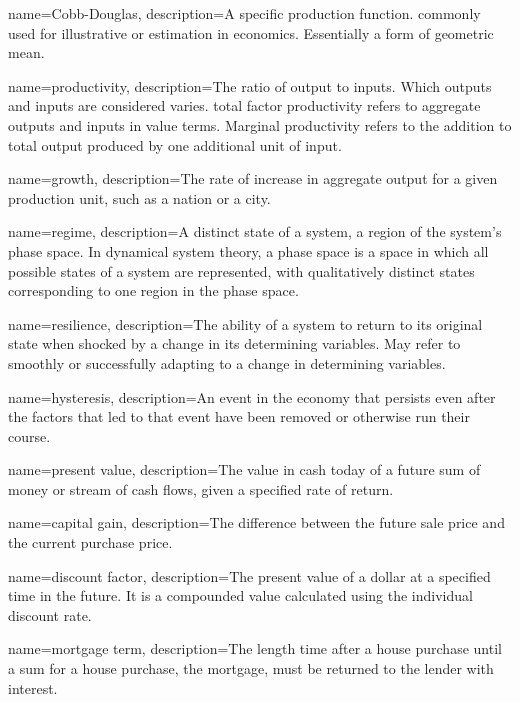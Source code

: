 {
name=Cobb-Douglas,
description={A specific production function. commonly used for illustrative or estimation in economics. Essentially a form of geometric mean.}
}

{
name=productivity,
description={The ratio of \gls{output} to \glspl{input}. Which outputs and inputs are considered varies. \gls{total factor productivity} refers to aggregate outputs and inputs in value terms. Marginal productivity refers to the addition to total output produced by one additional unit of input.} 
}

{
name=growth,
description={The rate of increase in aggregate \gls{output} for a given production unit, such as a nation  or a city.}
}

{
name=regime,
description={A distinct state of a system, a region of the system's phase space. In dynamical system theory, a phase space is a space in which all possible states of a system are represented, with qualitatively distinct  states corresponding to one region in the phase space.}
}

{
name=resilience,
description={The ability of a system to return to its original state when shocked by a change in its determining variables. May refer to smoothly or successfully adapting to a change in  determining variables.}
}

{
name=hysteresis,
description={An event in the economy that persists even after the factors that led to that event have been removed or otherwise run their course.}
}

{
name=present value,
description={The value in cash today of a future sum of money or stream of cash flows, given a specified rate of return.}
}

{
name=capital gain,
description={The difference between the future sale price and the current purchase price.}
}

{
name=discount factor,
description={The present value of a dollar at a specified time in the future. It is a compounded value calculated using the individual discount rate.}
}

{
name=mortgage term,
description={The length time after a house purchase until a sum for a house purchase, the mortgage, must be returned to the lender with interest.}
}

